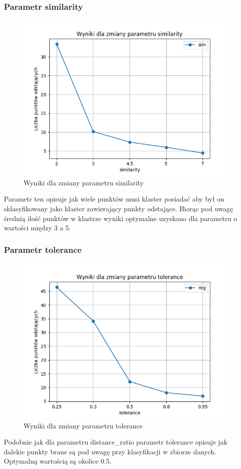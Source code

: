 \documentclass[eng,printmode]{mgr}
\begin{document}
\subsubsection{Parametr similarity}
\begin{figure}[H]
  \begin{center}
  \includegraphics[scale=0.7]{avg_similarity}
  \end{center}
  \caption{Wyniki dla zmiany parametru similarity}
  \label{fig:avg_similarity}
\end{figure}
Parametr ten opisuje jak wiele punktów musi klaster posiadać aby był on sklasyfikowany jako klaster zawierający punkty odstające. Biorąc pod uwagę średnią ilość punktów w klastrze wyniki optymalne uzyskano dla parametru o wartości między 3 a 5.
\subsubsection{Parametr tolerance}
\begin{figure}[H]
  \begin{center}
  \includegraphics[scale=0.7]{avg_tolerance}
  \end{center}
  \caption{Wyniki dla zmiany parametru tolerance}
  \label{fig:avg_tolerance}
\end{figure}
Podobnie jak dla parametru distance\_ratio parametr tolerance opisuje jak dalekie punkty brane są pod uwagę przy klasyfikacji w zbiorze danych. Optymalną wartością są okolice 0.5.
\end{document}
